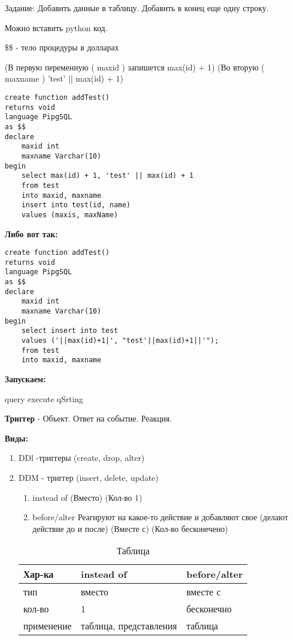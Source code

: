 Задание: Добавить данные в таблицу.
Добавить в конец еще одну строку.

Можно вставить python код.

\$\$ - тело процедуры в долларах

(В первую переменную ( maxid ) запишется max(id) + 1)
(Во вторую ( maxname ) 'test' || max(id) + 1)

\begin{lstlisting}[label=some-code,caption=Пример]
create function addTest()
returns void
language PipgSQL
as $$ 
declare 
	maxid int
	maxname Varchar(10)
begin
	select max(id) + 1, 'test' || max(id) + 1
	from test
	into maxid, maxname 
	insert into test(id, name)
	values (maxis, maxName)
\end{lstlisting}

\textbf{Либо вот так:}

\begin{lstlisting}[label=some-code,caption=Пример]
create function addTest()
returns void
language PipgSQL
as $$ 
declare 
	maxid int
	maxname Varchar(10)
begin
	select insert into test
	values ('||max(id)+1|', "test'||max(id)+1||'");
	from test
	into maxid, maxname 
\end{lstlisting}

\textbf{Запускаем:}

query execute qSrting

\textbf{Триггер} - Объект. Ответ на событие. Реакция.

\textbf{Виды:}

\begin{enumerate}
	\item DDl -триггеры (create, drop, alter)
	\item DDM - триггер (insert, delete, update)
	      \begin{enumerate}
		      \item instead of (Вместо) (Кол-во 1)
		      \item before/alter Реагируют на какое-то действие и добавляют свое (делают действие до и после) (Вместе с) (Кол-во бесконечено)
	      \end{enumerate}
	      \begin{table}[ht]
		      \centering
		      \begin{tabular}{ | l | l | l|}
			      \hline
			      Хар-ка     & instead of             & before/alter \\ \hline
			      тип        & вместо                 & вместе с     \\ \hline
			      кол-во     & 1                      & бесконечно   \\ \hline
			      применение & таблица, представления & таблица      \\ \hline
			      \hline
		      \end{tabular}
		      \caption{Таблица}
	      \end{table}
\end{enumerate}

